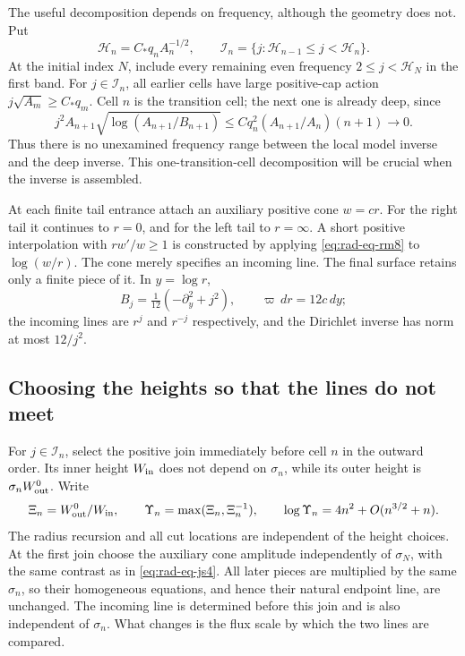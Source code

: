 The useful decomposition depends on frequency, although the geometry
does not.  Put
\begin{equation}\label{eq:rad-eq-rm21}
 \mathcal H_n=C_*q_nA_n^{-1/2},\qquad
 \mathcal I_n=\{j:\mathcal H_{n-1}\le j<\mathcal H_n\}.
\end{equation}
At the initial index $N$, include every remaining even frequency
$2\le j<\mathcal H_N$ in the first band.  For $j\in\mathcal I_n$,
all earlier cells have large positive-cap action
$j\sqrt{A_m}\ge C_*q_m$.  Cell $n$ is the transition cell; the
next one is already deep, since
\begin{equation}\label{eq:rad-eq-rm22}
 j^2A_{n+1}\sqrt{\log(A_{n+1}/B_{n+1})}
 \le Cq_n^2(A_{n+1}/A_n)(n+1)\longrightarrow0.
\end{equation}
Thus there is no unexamined frequency range between the local model
inverse and the deep inverse.  This one-transition-cell decomposition
will be crucial when the inverse is assembled.

At each finite tail entrance attach an auxiliary positive cone $w=cr$.
For the right tail it continues to $r=0$, and for the left tail to
$r=\infty$.  A short positive interpolation with $rw'/w\ge1$ is
constructed by applying \eqref{eq:rad-eq-rm8} to $\log(w/r)$.
The cone merely specifies an incoming line.  The final surface retains
only a finite piece of it.  In $y=\log r$,
\[
 B_j=\tfrac1{12}(-\partial_y^2+j^2),\qquad
 \varpi\,dr=12c\,dy;
\]
the incoming lines are $r^j$ and $r^{-j}$ respectively, and the
Dirichlet inverse has norm at most $12/j^2$.

\subsection{Choosing the heights so that the lines do not meet}

For $j\in\mathcal I_n$, select the positive join immediately before
cell $n$ in the outward order.  Its inner height $W_{\rm in}$ does
not depend on $\sigma_n$, while its outer height is
$\sigma_nW_{\rm out}^0$.  Write
\begin{equation}\label{eq:rad-eq-js4}
 \Xi_n=W_{\rm out}^0/W_{\rm in},\qquad
 \Upsilon_n=\max(\Xi_n,\Xi_n^{-1}),\qquad
 \log\Upsilon_n=4n^2+O(n^{3/2}+n).
\end{equation}
The radius recursion and all cut locations are independent of the height
choices.  At the first join choose the auxiliary cone amplitude
independently of $\sigma_N$, with the same contrast as in
\eqref{eq:rad-eq-js4}.
All later pieces are multiplied by the same $\sigma_n$, so their
homogeneous equations, and hence their natural endpoint line, are
unchanged.  The incoming line is determined before this join and is
also independent of $\sigma_n$.  What changes is the flux scale by
which the two lines are compared.

